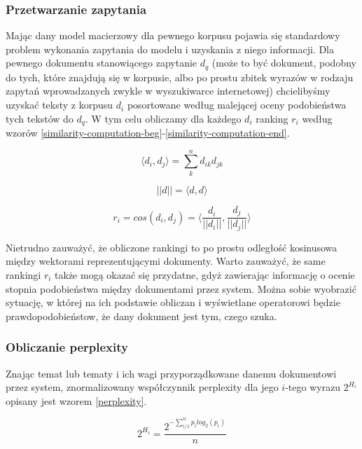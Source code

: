 \documentclass[11pt,a4paper]{article}
\begin{document}
\subsubsection{Przetwarzanie zapytania}
\label{processing}

Mając dany model macierzowy dla pewnego korpusu pojawia się standardowy problem
wykonania zapytania do modelu i uzyskania z niego informacji. Dla pewnego
dokumentu stanowiącego zapytanie $d_q$ (może to być dokument, podobny do tych,
które znajdują się w korpusie, albo po prostu zbitek wyrazów w rodzaju zapytań
wprowadzanych zwykle w wyszukiwarce internetowej) chcielibyśmy uzyskać teksty z
korpusu $d_i$ posortowane według malejącej oceny podobieństwa tych tekstów do
$d_q$. W tym celu obliczamy dla każdego $d_i$ ranking $r_i$ według wzorów
\ref{similarity-computation-beg}-\ref{similarity-computation-end}.

\begin{equation}
\label{similarity-computation-beg}
  \langle d_i, d_j \rangle = \sum_k^n d_{ik}d_{jk}
\end{equation}

\begin{equation}
  ||d|| = \langle d, d \rangle
\end{equation}

\begin{equation}
  \label{similarity-computation-end}
  r_i = cos(d_i, d_j) = \langle \frac{d_i}{||d_i||}, \frac{d_j}{||d_j||} \rangle
\end{equation}

Nietrudno zauważyć, że obliczone rankingi to po prostu odległość kosinusowa
między wektorami reprezentującymi dokumenty.  Warto zauważyć, że same rankingi
$r_i$ także mogą okazać się przydatne, gdyż zawierając informację o ocenie
stopnia podobieństwa między dokumentami przez system. Można sobie wyobrazić
sytuację, w której na ich podstawie obliczan i wyświetlane operatorowi będzie
prawdopodobieństow, że dany dokument jest tym, czego szuka.

\subsubsection{Obliczanie perplexity}

Znając temat lub tematy i ich wagi przyporządkowane danemu dokumentowi przez
system, znormalizowany współczynnik perplexity dla jego $i$-tego wyrazu
$2^{H_i}$ opisany jest wzorem \ref{perplexity}.

\begin{equation}
  \label{perplexity}
  2^{H_i} = \frac{2^{-\sum_{i/1}^n p_ilog_2(p_i)}}{n}
\end{equation}
\end{document}
